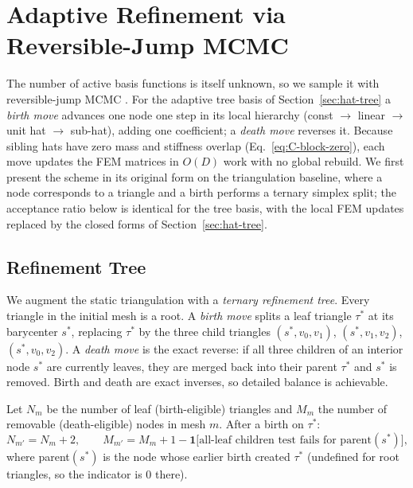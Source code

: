 \documentclass[11pt]{article}
\begin{document}
\section{Adaptive Refinement via Reversible-Jump MCMC}
\label{sec:rjmcmc}

The number of active basis functions is itself unknown, so we sample it with
reversible-jump MCMC \citep{green1995}.  For the adaptive tree basis of
Section~\ref{sec:hat-tree} a \emph{birth move} advances one node one step in its
local hierarchy (const $\to$ linear $\to$ unit hat $\to$ sub-hat), adding one
coefficient; a \emph{death move} reverses it.  Because sibling hats have zero
mass and stiffness overlap (Eq.~\eqref{eq:C-block-zero}), each move updates the
FEM matrices in $O(D)$ work with no global rebuild.  We first present the scheme
in its original form on the triangulation baseline, where a node corresponds to
a triangle and a birth performs a ternary simplex split; the acceptance ratio
below is identical for the tree basis, with the local FEM updates replaced by
the closed forms of Section~\ref{sec:hat-tree}.

\subsection{Refinement Tree}

We augment the static triangulation with a \emph{ternary refinement tree}.
Every triangle in the initial mesh is a root.  A \emph{birth move} splits a
leaf triangle $\tau^*$ at its barycenter $s^*$, replacing $\tau^*$ by the
three child triangles $(s^*,v_0,v_1)$, $(s^*,v_1,v_2)$, $(s^*,v_0,v_2)$.
A \emph{death move} is the exact reverse: if all three children of an
interior node $s^*$ are currently leaves, they are merged back into their
parent $\tau^*$ and $s^*$ is removed.  Birth and death are exact inverses,
so detailed balance is achievable.

Let $N_m$ be the number of leaf (birth-eligible) triangles and $M_m$ the
number of removable (death-eligible) nodes in mesh $m$.  After a birth on
$\tau^*$:
\begin{equation}
  N_{m'} = N_m + 2, \qquad
  M_{m'} = M_m + 1
           - \mathbf{1}\bigl[\text{all-leaf children test fails for parent}(s^*)\bigr],
  \label{eq:NM-update}
\end{equation}
where parent$(s^*)$ is the node whose earlier birth created $\tau^*$
(undefined for root triangles, so the indicator is 0 there).
\end{document}
